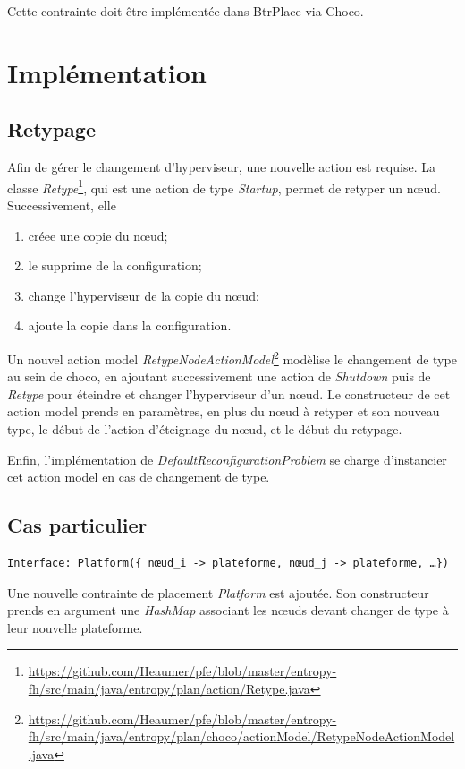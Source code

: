 \documentclass[a4paper]{article}
\begin{document}
Cette contrainte doit être implémentée dans BtrPlace via Choco.

\section{Implémentation}
\subsection{Retypage}
Afin de gérer le changement d'hyperviseur, une nouvelle action est requise.
La classe \textit{Retype}\footnote{\url{https://github.com/Heaumer/pfe/blob/master/entropy-fh/src/main/java/entropy/plan/action/Retype.java}}, qui est
une action de type \textit{Startup}, permet de retyper un nœud. 
Successivement, elle
\begin{enumerate}
	\item créee une copie du nœud;
	\item le supprime de la configuration;
	\item change l'hyperviseur de la copie du nœud;
	\item ajoute la copie dans la configuration.
\end{enumerate}

Un nouvel action model \textit{RetypeNodeActionModel}\footnote{\url{https://github.com/Heaumer/pfe/blob/master/entropy-fh/src/main/java/entropy/plan/choco/actionModel/RetypeNodeActionModel.java}}
modèlise le changement de type au sein de choco, en ajoutant successivement
une action de \textit{Shutdown} puis de \textit{Retype} pour éteindre et
changer l'hyperviseur d'un nœud. Le constructeur de cet action model prends
en paramètres, en plus du nœud à retyper et son nouveau type, le début de
l'action d'éteignage du nœud, et le début du retypage.

Enfin, l'implémentation de \textit{DefaultReconfigurationProblem} se charge
d'instancier cet action model en cas de changement de type.

\subsection{Cas particulier}
\begin{verbatim}
Interface: Platform({ nœud_i -> plateforme, nœud_j -> plateforme, …})
\end{verbatim}

Une nouvelle contrainte de placement \textit{Platform} est ajoutée. Son
constructeur prends en argument une \textit{HashMap} associant les
nœuds devant changer de type à leur nouvelle plateforme.
\end{document}
